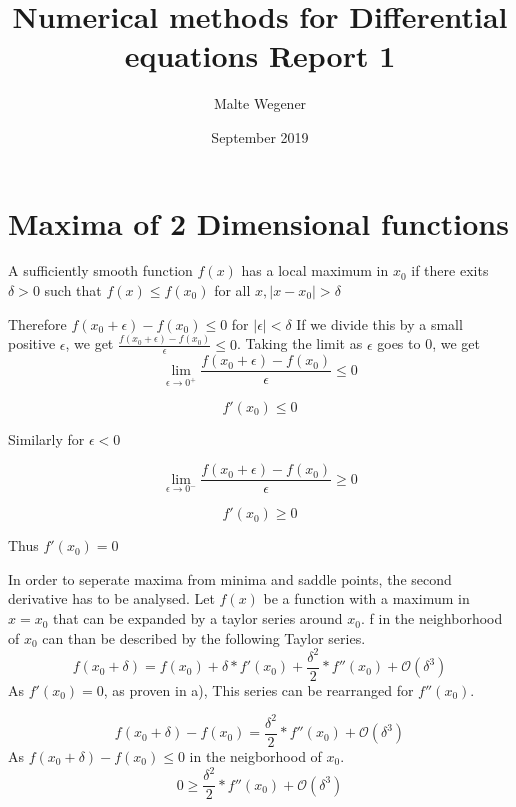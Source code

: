 \documentclass{article}
\title{Numerical methods for Differential equations Report 1}
\author{Malte Wegener}
\date{September 2019}
\begin{document}
\maketitle
    
\section{Maxima of  2 Dimensional functions}

A sufficiently smooth function $f(x)$ has a local maximum in $x_{0}$ if there exits $\delta > 0$ such that $f(x) \leq f(x_{0})$ for all $x, \mid x - x_{0} \mid > \delta$ \par
Therefore $f(x_{0}+\epsilon)-f(x_{0}) \leq 0$ for $\mid \epsilon \mid < \delta$
If we divide this by a small positive $\epsilon$, we get $\frac{f(x_{0}+\epsilon)-f(x_{0})}{\epsilon}\leq 0$.
Taking the limit as $\epsilon$ goes to 0, we get
\begin{equation}
   \lim_{\epsilon\to 0^{+}} \frac{f(x_{0}+\epsilon)-f(x_{0})}{\epsilon}\leq 0
\end{equation}

\begin{equation}
   f'(x_{0})\leq 0
\end{equation}

Similarly for $\epsilon < 0$

\begin{equation}
   \lim_{\epsilon\to 0^{-}} \frac{f(x_{0}+\epsilon)-f(x_{0})}{\epsilon}\geq 0
  \end{equation}
   
\begin{equation}
   f'(x_{0})\geq 0
\end{equation}

Thus $f'(x_{0}) = 0$

In order to seperate maxima from minima and saddle points, the second derivative has to be analysed.
Let $f(x)$ be a function with a maximum in $x=x_{0}$ that can be expanded by a taylor series around $x_{0}$. f in the neighborhood of $x_{0}$ can than be described by the following Taylor series.
\begin{equation}
    f(x_{0}+\delta) = f(x_{0})+\delta*f'(x_{0})+\frac{\delta^2}{2}*f''(x_{0}) + \mathcal{O}(\delta^3)
\end{equation}
As $f'(x_{0}) = 0$, as proven in a), This series can be rearranged for $f''(x_{0})$.

\begin{equation}
    f(x_{0}+\delta) - f(x_{0}) = \frac{\delta^2}{2}*f''(x_{0}) + \mathcal{O}(\delta^3)
\end{equation}
 As $f(x_{0}+\delta) - f(x_{0}) \leq 0$ in the neigborhood of $x_{0}$.
\begin{equation}
    0 \geq \frac{\delta^2}{2}*f''(x_{0}) + \mathcal{O}(\delta^3)
\end{equation}
\end{document}
